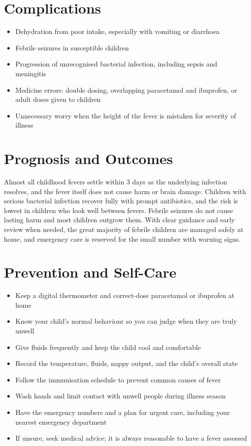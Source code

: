 \section*{Complications}
\begin{itemize}
    \item Dehydration from poor intake, especially with vomiting or diarrhoea
    \item Febrile seizures in susceptible children
    \item Progression of unrecognised bacterial infection, including sepsis and meningitis
    \item Medicine errors: double dosing, overlapping paracetamol and ibuprofen, or adult doses given to children
    \item Unnecessary worry when the height of the fever is mistaken for severity of illness
\end{itemize}

\section*{Prognosis and Outcomes}
Almost all childhood fevers settle within 3 days as the underlying infection resolves, and the fever itself does not cause harm or brain damage. Children with serious bacterial infection recover fully with prompt antibiotics, and the risk is lowest in children who look well between fevers. Febrile seizures do not cause lasting harm and most children outgrow them. With clear guidance and early review when needed, the great majority of febrile children are managed safely at home, and emergency care is reserved for the small number with warning signs.

\section*{Prevention and Self-Care}
\begin{itemize}
    \item Keep a digital thermometer and correct-dose paracetamol or ibuprofen at home
    \item Know your child's normal behaviour so you can judge when they are truly unwell
    \item Give fluids frequently and keep the child cool and comfortable
    \item Record the temperature, fluids, nappy output, and the child's overall state
    \item Follow the immunisation schedule to prevent common causes of fever
    \item Wash hands and limit contact with unwell people during illness season
    \item Have the emergency numbers and a plan for urgent care, including your nearest emergency department
    \item If unsure, seek medical advice; it is always reasonable to have a fever assessed
\end{itemize}

